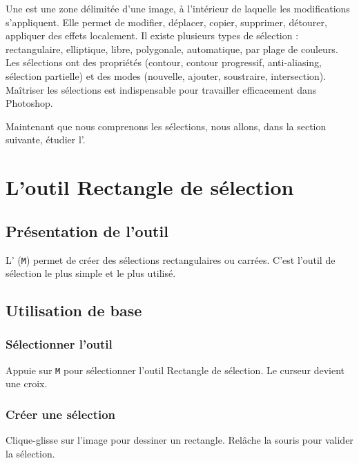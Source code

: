 Une  est une zone délimitée d'une image, à l'intérieur de laquelle les modifications s'appliquent. Elle permet de modifier, déplacer, copier, supprimer, détourer, appliquer des effets localement. Il existe plusieurs types de sélection : rectangulaire, elliptique, libre, polygonale, automatique, par plage de couleurs. Les sélections ont des propriétés (contour, contour progressif, anti-aliasing, sélection partielle) et des modes (nouvelle, ajouter, soustraire, intersection). Maîtriser les sélections est indispensable pour travailler efficacement dans Photoshop.

Maintenant que nous comprenons les sélections, nous allons, dans la section suivante, étudier l'.

\section{L'outil Rectangle de sélection}

\subsection{Présentation de l'outil}

L' (\texttt{M}) permet de créer des sélections rectangulaires ou carrées. C'est l'outil de sélection le plus simple et le plus utilisé.

\subsection{Utilisation de base}

\subsubsection{Sélectionner l'outil}

Appuie sur \texttt{M} pour sélectionner l'outil Rectangle de sélection. Le curseur devient une croix.

\subsubsection{Créer une sélection}

Clique-glisse sur l'image pour dessiner un rectangle. Relâche la souris pour valider la sélection.

